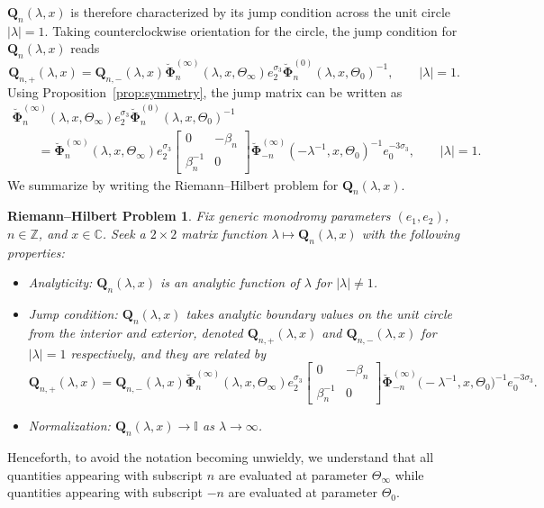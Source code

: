 \documentclass[11pt]{article}
\numberwithin{equation}{section}
\numberwithin{equation}{section}
\newtheorem{rhp}[Theorem]{Riemann--Hilbert Problem}
\newcommand{\para}[1]{\breve{#1}}
\begin{document}
$\mathbf{Q}_n(\lambda,x)$ is therefore characterized by its jump condition across the unit circle $|\lambda|=1$. Taking counterclockwise orientation for the circle, the jump condition for $\mathbf{Q}_n(\lambda,x)$ reads
\begin{equation*}
 \mathbf{Q}_{n,+}(\lambda,x)=\mathbf{Q}_{n,-}(\lambda,x)\para{\mathbf{\Phi}}_n^{(\infty)}(\lambda,x, \Theta_\infty)e_2^{\sigma_3}\para{\mathbf{\Phi}}_n^{(0)}(\lambda,x, \Theta_0)^{-1},\qquad |\lambda|=1.
\end{equation*}
Using Proposition~\ref{prop:symmetry}, the jump matrix can be written as
\begin{gather}
 \para{\mathbf{\Phi}}_n^{(\infty)}(\lambda,x, \Theta_\infty)e_2^{\sigma_3}\para{\mathbf{\Phi}}_n^{(0)}(\lambda,x, \Theta_0)^{-1}\nonumber\\
 \qquad =\para{\mathbf{\Phi}}^{(\infty)}_n(\lambda,x, \Theta_\infty) e_2^{\sigma_3}
 \begin{bmatrix}0 & -\beta_n\\ \beta_n^{-1} & 0\end{bmatrix}
 \para{\mathbf{\Phi}}^{(\infty)}_{-n}(-\lambda^{-1},x, \Theta_0)^{-1}e_0^{-3\sigma_3},\qquad |\lambda|=1.\label{eq:VQ-rewrite}
\end{gather}
We summarize by writing the Riemann--Hilbert problem for $\mathbf{Q}_n(\lambda,x)$.
\begin{rhp}\label{rhp:Q}
Fix generic monodromy parameters $( e_1, e_2)$, $n\in\mathbb{Z}$, and $x\in\mathbb{C}$. Seek a $2\times 2$ matrix function $\lambda\mapsto\mathbf{Q}_n(\lambda,x)$ with the following properties:
\begin{itemize}\itemsep=0pt\samepage
 \item Analyticity: $\mathbf{Q}_n(\lambda,x)$ is an analytic function of $\lambda$ for $|\lambda|\neq 1$.
 \item Jump condition:
 $\mathbf{Q}_n(\lambda,x)$ takes analytic boundary values on the unit circle from the interior and exterior, denoted $\mathbf{Q}_{n,+}(\lambda,x)$ and $\mathbf{Q}_{n,-}(\lambda,x)$ for $|\lambda|=1$ respectively, and they are related by
 \begin{equation*}
 \mathbf{Q}_{n,+}(\lambda,x)=\mathbf{Q}_{n,-}(\lambda,x)\breve{\mathbf{\Phi}}_n^{(\infty)}(\lambda,x,\Theta_\infty)e_2^{\sigma_3}
 \begin{bmatrix}0 & -\beta_n\\\beta_n^{-1} & 0\end{bmatrix}
 \para{\mathbf{\Phi}}^{(\infty)}_{-n}\bigl(-\lambda^{-1},x, \Theta_0\bigr)^{-1}e_0^{-3\sigma_3}.
 \end{equation*}
 \item Normalization:
 $\mathbf{Q}_n(\lambda,x)\to\mathbb{I}$ as $\lambda\to\infty$.
\end{itemize}
\end{rhp}
Henceforth, to avoid the notation becoming unwieldy, we understand that all quantities appearing with subscript $n$ are evaluated at parameter $\Theta_\infty$ while quantities appearing with subscript $-n$ are evaluated at parameter $\Theta_0$.
\end{document}
